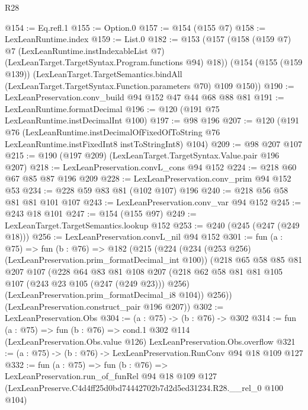 \begin{lexlean}{R28}
\begin{coremodule}
@154 := Eq.refl.{1}
@155 := Option.{0}
@157 := @154 (@155 @7)
@158 := LexLeanRuntime.index
@159 := List.{0}
@182 := @153
    (@157
      (@158
        (@159 @7)
        @7
        (LexLeanRuntime.instIndexableList @7)
        (LexLeanTarget.TargetSyntax.Program.functions @94)
        @18))
    (@154
      (@155 (@159 @139))
      (LexLeanTarget.TargetSemantics.bindAll
        (LexLeanTarget.TargetSyntax.Function.parameters @70)
        @109
        @150))
@190 := LexLeanPreservation.conv_build @94 @152 @47 @44 @68 @88 @81
@191 := LexLeanRuntime.formatDecimal
@196 := @120 (@191 @75 LexLeanRuntime.instDecimalInt @100)
@197 := @98 @196
@207 := @120
    (@191
      @76
      (LexLeanRuntime.instDecimalOfFixedOfToString
        @76
        LexLeanRuntime.instFixedInt8
        instToStringInt8)
      @104)
@209 := @98 @207 @107
@215 := @190 (@197 @209) (LexLeanTarget.TargetSyntax.Value.pair @196 @207)
@218 := LexLeanPreservation.convL_cons @94 @152
@224 := @218 @60 @67 @85 @87 @196 @209
@228 := LexLeanPreservation.conv_prim @94 @152 @53
@234 := @228 @59 @83 @81 (@102 @107) @196
@240 := @218 @56 @58 @81 @81 @101 @107
@243 := LexLeanPreservation.conv_var @94 @152
@245 := @243 @18 @101
@247 := @154 (@155 @97)
@249 := LexLeanTarget.TargetSemantics.lookup @152
@253 := @240 (@245 (@247 (@249 @18)))
@256 := LexLeanPreservation.convL_nil @94 @152
@301 := fun (a : @75) =>
  fun (b : @76) =>
  @182
    (@215
      (@224
        (@234 (@253 @256) (LexLeanPreservation.prim_formatDecimal_int @100))
        (@218
          @65
          @58
          @85
          @81
          @207
          @107
          (@228
            @64
            @83
            @81
            @108
            @207
            (@218 @62 @58 @81 @81 @105 @107 (@243 @23 @105 (@247 (@249 @23))) @256)
            (LexLeanPreservation.prim_formatDecimal_i8 @104))
          @256))
      (LexLeanPreservation.construct_pair @196 @207))
@302 := LexLeanPreservation.Obs
@304 := (a : @75) -> (b : @76) -> @302
@314 := fun (a : @75) =>
  fun (b : @76) =>
  cond.{1} @302 @114 (LexLeanPreservation.Obs.value @126) LexLeanPreservation.Obs.overflow
@321 := (a : @75) -> (b : @76) -> LexLeanPreservation.RunConv @94 @18 @109 @127
@332 := fun (a : @75) =>
  fun (b : @76) =>
  LexLeanPreservation.run_of_funRel
    @94
    @18
    @109
    @127
    (LexLeanPreserve.C4d4ff25d0bd74442702b7d2d5ed31234.R28.__rel_0 @100 @104)
\end{coremodule}
\end{lexlean}
